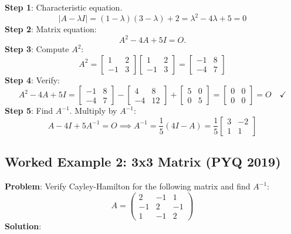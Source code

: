 \documentclass[
]{article}
\begin{document}
\textbf{Step 1}: Characteristic equation.
\[
|A - \lambda I| = (1 - \lambda)(3 - \lambda) + 2 = \lambda^2 - 4\lambda + 5 = 0
\]
\textbf{Step 2}: Matrix equation:
\[
A^2 - 4A + 5I = O.
\]
\textbf{Step 3}: Compute \(A^2\):
\[
A^2 =
\begin{bmatrix}
1 & 2 \\
-1 & 3
\end{bmatrix}\begin{bmatrix} 1 & 2 \\ -1 & 3 \end{bmatrix} = \begin{bmatrix} -1 & 8 \\ -4 & 7 \end{bmatrix}
\]
\textbf{Step 4}: Verify:
\[
A^2 - 4A + 5I =
\begin{bmatrix}
-1 & 8 \\
-4 & 7
\end{bmatrix} - \begin{bmatrix} 4 & 8 \\ -4 & 12 \end{bmatrix} + \begin{bmatrix} 5 & 0 \\ 0 & 5 \end{bmatrix} = \begin{bmatrix} 0 & 0 \\ 0 & 0 \end{bmatrix} = O \quad \checkmark
\]
\textbf{Step 5}: Find \(A^{-1}\). Multiply by \(A^{-1}\):
\[
A - 4I + 5A^{-1} = O \implies A^{-1} = \frac{1}{5}(4I - A) = \frac{1}{5}
\begin{bmatrix}
3 & -2 \\
1 & 1
\end{bmatrix}
\]

\subsection{Worked Example 2: 3x3 Matrix (PYQ
2019)}\label{worked-example-2-3x3-matrix-pyq-2019}

\textbf{Problem}: Verify Cayley-Hamilton for the following matrix and
find \(A^{-1}\):
\[
A =
\begin{pmatrix}
2 & -1 & 1 \\
-1 & 2 & -1 \\
1 & -1 & 2
\end{pmatrix}
\]
\textbf{Solution}:
\end{document}
